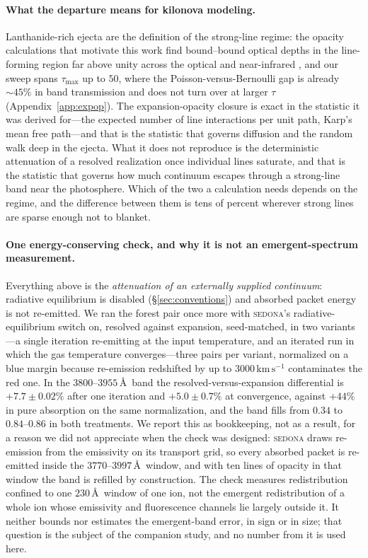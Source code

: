\documentclass[fleqn,usenatbib]{mnras}
\newcommand{\kms}{\,\mathrm{km\,s^{-1}}}
\begin{document}
\paragraph{What the departure means for kilonova modeling.}
Lanthanide-rich ejecta are the definition of the strong-line regime: the
opacity calculations that motivate this work find bound--bound optical depths
in the line-forming region far above unity across the optical and
near-infrared \citep{tanaka2020,kato2024}, and our sweep spans
$\tau_{\max}$ up to $50$, where the Poisson-versus-Bernoulli gap is already
$\sim45\%$ in band transmission and does not turn over at larger $\tau$
(Appendix~\ref{app:expop}). The expansion-opacity closure is exact in the
statistic it was derived for---the expected number of line interactions per
unit path, Karp's mean free path---and that is the statistic that governs
diffusion and the random walk deep in the ejecta. What it does not reproduce
is the deterministic attenuation of a resolved realization once individual
lines saturate, and that is the statistic that governs how much continuum
escapes through a strong-line band near the photosphere. Which of the two a
calculation needs depends on the regime, and the difference between them is
tens of percent wherever strong lines are sparse enough not to blanket.

\paragraph{One energy-conserving check, and why it is not an emergent-spectrum
measurement.} Everything above is the \emph{attenuation of an externally
supplied continuum}: radiative equilibrium is disabled
(\S\ref{sec:conventions}) and absorbed packet energy is not re-emitted. We
ran the forest pair once more with \textsc{sedona}'s radiative-equilibrium
switch on, resolved against expansion, seed-matched, in two variants---a
single iteration re-emitting at the input temperature, and an iterated run in
which the gas temperature converges---three pairs per variant, normalized on a
blue margin because re-emission redshifted by up to $3000\kms$ contaminates
the red one. In the $3800$--$3955$\,\AA\ band the resolved-versus-expansion
differential is $+7.7\pm0.02\%$ after one iteration and $+5.0\pm0.7\%$ at
convergence, against $+44\%$ in pure absorption on the same normalization,
and the band fills from $0.34$ to $0.84$--$0.86$ in both treatments. We report
this as bookkeeping, not as a result, for a reason we did not appreciate when
the check was designed: \textsc{sedona} draws re-emission from the emissivity
on its transport grid, so every absorbed packet is re-emitted inside the
$3770$--$3997$\,\AA\ window, and with ten lines of opacity in that window
the band is refilled by construction. The check measures redistribution
confined to one $230$\,\AA\ window of one ion, not the emergent
redistribution of a whole ion whose emissivity and fluorescence channels lie
largely outside it. It neither bounds nor estimates the emergent-band error,
in sign or in size; that question is the subject of the companion study, and
no number from it is used here.
\end{document}

